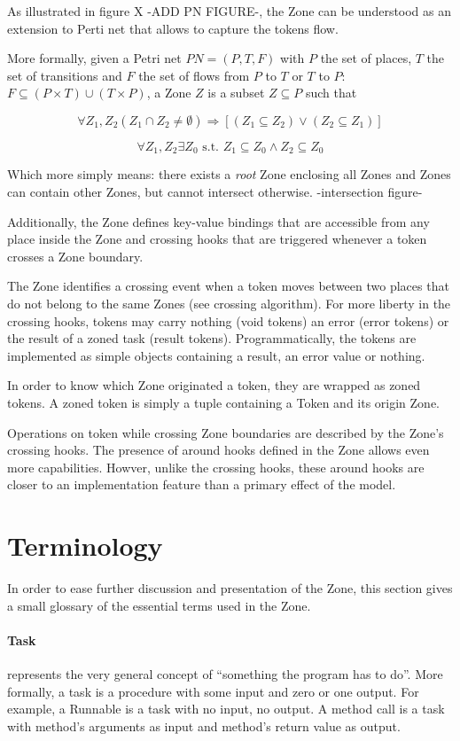 As illustrated in figure X -ADD PN FIGURE-, the Zone can be understood as an extension to Perti net that allows to capture the tokens flow.

More formally, given a Petri net $PN = (P, T, F)$ with $P$ the set of places, $T$ the set of transitions and $F$ the set of flows from $P$ to $T$ or $T$ to $P$: $F \subseteq (P \times T) \cup (T \times P)$, a Zone $Z$ is a subset $Z \subseteq P$ such that

$$\forall Z_1, Z_2 (Z_1 \cap Z_2 \neq \emptyset) \Rightarrow [(Z_1 \subseteq Z_2) \lor (Z_2 \subseteq Z_1)] $$

$$\forall Z_1, Z_2 \exists Z_0 \text{ s.t. } Z_1 \subseteq Z_0 \land Z_2 \subseteq Z_0 $$

Which more simply means: there exists a \emph{root} Zone enclosing all Zones and Zones can contain other Zones, but cannot intersect otherwise. -intersection figure-

Additionally, the Zone defines key-value bindings that are accessible from any place inside the Zone and crossing hooks that are triggered whenever a token crosses a Zone boundary.

The Zone identifies a crossing event when a token moves between two places that do not belong to the same Zones (see crossing algorithm). For more liberty in the crossing hooks, tokens may carry nothing (void tokens) an error (error tokens) or the result of a zoned task (result tokens). Programmatically, the tokens are implemented as simple objects containing a result, an error value or nothing.

In order to know which Zone originated a token, they are wrapped as zoned tokens. A zoned token is simply a tuple containing a Token and its origin Zone.

Operations on token while crossing Zone boundaries are described by the Zone's crossing hooks.
The presence of around hooks defined in the Zone allows even more capabilities. Howver, unlike the crossing hooks, these around hooks are closer to an implementation feature than a primary effect of the model.

\section{Terminology}

In order to ease further discussion and presentation of the Zone, this section gives a small glossary of the essential terms used in the Zone.


\paragraph{Task} represents the very general concept of ``something the program has to do''. More formally, a task is a procedure with some input and zero or one output. For example, a Runnable is a task with no input, no output. A method call is a task with method's arguments as input and method's return value as output.

